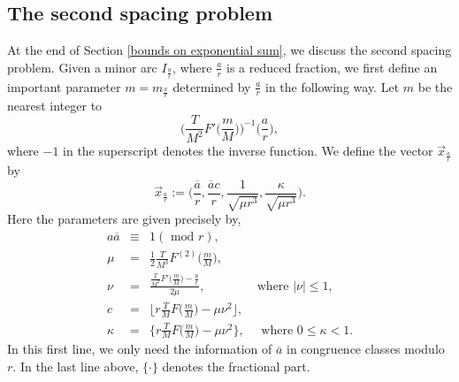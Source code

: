\documentclass[11pt]{amsart}
\numberwithin{equation}{section}
\theoremstyle{definition}
\theoremstyle{proposition}
\begin{document}
\subsection{The second spacing problem}
At the end of Section \ref{bounds on exponential sum}, we discuss the second spacing problem. Given a minor arc $I_{\frac{a}{r}}$, where $\frac{a}{r}$ is a reduced fraction, we first define an important parameter $m=m_{\frac{a}{r}}$ determined by $\frac{a}{r}$ in the following way.  Let $m$ be the  nearest integer to 
\[
\Big(\frac{T}{M^2}F'\Big(\frac{m}{M}\Big) \Big)^{-1} \Big(\frac{a}{r}\Big),
\]
where $-1$ in the superscript denotes the inverse function. We define the vector $\Vec{x}_{\frac{a}{r}}$ by
\begin{equation} \label{x sub a/r}
\Vec{x}_{\frac{a}{r}}:=\Big( \frac{\overline{a}}{r}, \frac{\overline{a}c}{r}, \frac{1}{\sqrt{\mu r^3}}, \frac{\kappa}{\sqrt{\mu r^3}} \Big). 
\end{equation}
Here the parameters are given precisely by,
\[
\begin{array}{rcl}
a\overline{a} & \equiv & 1(\text{ mod }r) ,  \\
\mu & = & \frac{1}{2} \frac{T}{M^3}F^{(2)}\Big( \frac{m}{M}\Big) , \\ 
\nu &= &\frac{\frac{T}{M^2}F'\Big(\frac{m}{M}\Big)-\frac{a}{r}}{2\mu}, \quad \,\,\,\, \, \qquad \text{ where } |\nu|\le 1 , \\   
c &=& \lfloor r \frac{T}{M}F\Big(\frac{m}{M}\Big) -\mu \nu^2 \rfloor,  \\ 
\kappa &=& \Big\{r \frac{T}{M}F\Big(\frac{m}{M}\Big) -\mu \nu^2  \Big\}, \quad  \text{ where } 0\le \kappa <1. 
\end{array}
\]
In this first line, we only need the information of $\overline{a}$ in congruence classes modulo $r$. In the last line above, $\{\cdot \}$ denotes the fractional part.  
\end{document}
